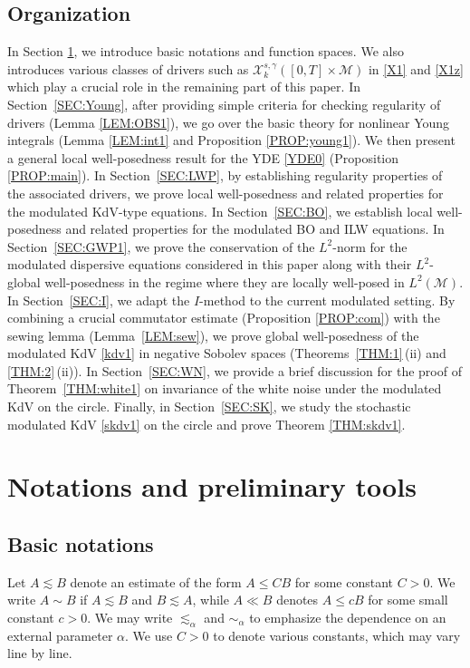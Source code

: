 \documentclass[letterpaper, 11pt,  reqno]{amsart}
\newcommand{\1}{\hspace{0.5mm}\text{I}\hspace{0.5mm}}
\newcommand{\al}{\alpha}
\newcommand{\g}{\gamma}
\newcommand{\les}{\lesssim}
\newcommand{\M}{\mathcal{M}}
\newcommand{\cX}{\mathcal{X}}
\numberwithin{equation}{section}
\numberwithin{theorem}{section}
\begin{document}
\subsection{Organization}

In Section
\ref{SEC:2}, 
we introduce basic notations and function spaces.
We also introduces various classes of drivers
such as $\cX^{s, \g}_k ([0, T]\times \M)$ in \eqref{X1}
and \eqref{X1z}
which play a crucial role in the remaining part of this paper.
In Section~\ref{SEC:Young}, 
after providing simple criteria
for checking regularity of drivers (Lemma \ref{LEM:OBS1}), 
we go over the basic theory
for nonlinear Young integrals
(Lemma \ref{LEM:int1} and Proposition \ref{PROP:young1}).
We then present a general local well-posedness
result for the YDE \eqref{YDE0}
(Proposition \ref{PROP:main}).
In Section~\ref{SEC:LWP}, 
by establishing regularity properties
of the associated drivers, 
we prove local well-posedness and related properties
for the modulated KdV-type equations.
In Section~\ref{SEC:BO}, 
we establish local well-posedness and related properties
for the modulated BO and ILW  equations.
In Section~\ref{SEC:GWP1}, 
we prove the conservation of the $L^2$-norm
for the modulated dispersive equations considered in this paper
along with their $L^2$-global well-posedness
in the regime where they are locally well-posed in $L^2(\M)$.
In Section~\ref{SEC:I}, we adapt the $I$-method
to the current modulated setting.
By combining a crucial  commutator estimate
(Proposition \ref{PROP:com})
with the sewing lemma (Lemma~\ref{LEM:sew}), 
we prove global well-posedness of the modulated
KdV \eqref{kdv1} in negative Sobolev spaces
(Theorems~\ref{THM:1}\,(ii) and \ref{THM:2}\,(ii)).
In Section~\ref{SEC:WN}, we provide a brief discussion 
for
the proof of Theorem~\ref{THM:white1}
on invariance of the white noise under the modulated KdV on the circle.
Finally, 
in Section~\ref{SEC:SK}, 
we study the stochastic modulated KdV
\eqref{skdv1} on the circle and prove Theorem \ref{THM:skdv1}.





\section{Notations and preliminary tools}
\label{SEC:2}

\subsection{Basic notations}
Let $A\les B$ denote an estimate of the form $A\leq CB$ for some constant $C>0$. We write $A\sim B$ if $A\les B$ and $B\les A$, while $A\ll B$ denotes $A\leq c B$ for some small constant $c> 0$. 
We may write  $\les_{\al}$ and $\sim_{\al}$ to 
emphasize the dependence on an external parameter $\al$.
We use $C>0$ to denote various constants, which may vary line by line.
\end{document}
